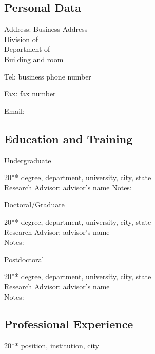 \documentclass[11pt]{article}
\newenvironment{lyxlist}[1]
	{\begin{list}{}
		{\setlength\itemsep{-0.5ex}
		\settowidth{\labelwidth}{#1}
		 \setlength{\leftmargin}{\labelwidth}
		 \addtolength{\leftmargin}{\labelsep}
		 \renewcommand{\makelabel}[1]{##1\hfil}}}
	{\end{list}}
\begin{document}
\subsection*{Personal Data}
\begin{lyxlist}{0000-present}
\item[{Address:}] Business Address\\
Division of\\
Department of\\  
Building and room
\item[{Tel:}]business phone number
\item[{Fax:}]fax number
\item[{Email:}]\href{mailto:}{}
\end{lyxlist}

\subsection*{Education and Training}
\begin{lyxlist}{0000-present}
\item[{\textcolor{color1}{Undergraduate}}]
\item [{{20{*}{*}\textendash 20{*}{*}}}]degree, department, university, city, state\\
Research Advisor: advisor's name
Notes:
\item[{\textcolor{color1}{Doctoral/Graduate}}]
\item [{{20{*}{*}\textendash 20{*}{*}}}]degree, department, university, city, state\\
Research Advisor: advisor's name\\
Notes:
\item[{\textcolor{color1}{Postdoctoral}}]
\item [{{20{*}{*}\textendash 20{*}{*}}}]degree, department, university, city, state\\
Research Advisor: advisor's name\\
Notes:
\end{lyxlist}

\subsection*{Professional Experience}

\begin{lyxlist}{0000-present}
\item [{20{*}{*}\textendash 20{*}{*}}]position, institution, city

\end{lyxlist}
\end{document}
